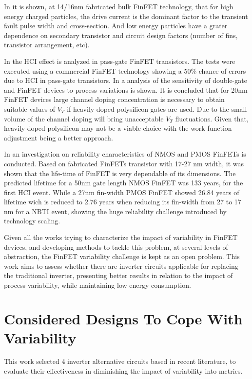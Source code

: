 \documentclass[diss,pgmicro,english]{iiufrgs}
\begin{document}
In \cite{FinFET01} it is shown, at 14/16nm fabricated bulk FinFET technology, that for high energy charged particles, the drive current is the dominant factor to the transient fault pulse width and cross-section. And low energy particles have a grater dependence on secondary transistor and circuit design factors (number of fins, transistor arrangement, etc).

In \cite{FinFET02} the HCI effect is analyzed in pass-gate FinFET transistors. The tests were executed using a commercial FinFET technology showing a 50\% chance of errors due to HCI in pass-gate transistors. In \cite{FinFET03} a analysis of the sensitivity of double-gate and FinFET devices to process variations is shown. It is concluded that for 20nm FinFET devices large channel doping concentration is necessary to obtain suitable values of $V_T$ if heavily doped polysilicon gates are used. Due to the small volume of the channel doping will bring unacceptable $V_T$ fluctuations. Given that, heavily doped polysilicon may not be a viable choice with the work function adjustment being a better approach.

 In \cite{FINFET05} an investigation on reliability characteristics of NMOS and PMOS FinFETs is conducted. Based on fabricated FinFETs transistor with 17-27 nm width, it was shown that the life-time of FinFET is very dependable of its dimensions. The predicted lifetime for a 50nm gate length NMOS FinFET was 133 years, for the first HCI event. While a 27nm fin-width PMOS FinFET showed 26.84 years of lifetime wich is reduced to 2.76 years when reducing its fin-width from 27 to 17 nm for a NBTI event, showing the huge reliability challenge introduced by technology scaling.

Given all the works trying to characterize the impact of variability in FinFET devices, and developing methods to tackle this problem, at several levels of abstraction, the FinFET variability challenge is kept as an open problem. This work aims to assess whether there are inverter circuits applicable for replacing the traditional inverter, presenting better results in relation to the impact of process variability, while maintaining low energy consumption.


\chapter{Considered Designs To Cope With Variability}

This work selected 4 inverter alternative circuits based in recent literature, to evaluate their effectiveness in diminishing the impact of variability into metrics.
\end{document}

